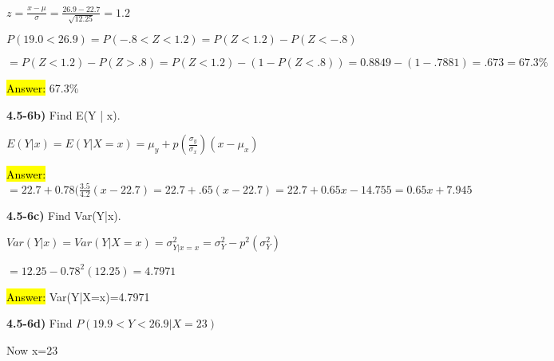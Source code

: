 \documentclass{article}
\begin{document}
\vspace{2mm}


$z=\frac{x-\mu}{\sigma}=\frac{26.9-22.7}{\sqrt{12.25}}=1.2$

\vspace{2mm}



$P(19.0 < 26.9)=P(-.8 < Z < 1.2)=P(Z < 1.2)-P(Z <-.8)$

\vspace{2mm}

$=P(Z < 1.2) - P(Z > .8)=P(Z < 1.2) - (1-P(Z <.8))=0.8849-(1-.7881)=.673=67.3\%$

\vspace{2mm}


\hl{Answer:} 67.3\%


\vspace{4mm}

\textbf{4.5-6b)} Find E(Y | x).

\vspace{2mm}

$E(Y | x)=E(Y | X=x)=\mu_{y}+p(\frac{\sigma_{y}}{\sigma_{x}})(x-\mu_{x})$

\vspace{2mm}

 \hl{Answer:}  $=22.7+0.78(\frac{3.5}{4.2}(x-22.7)=22.7+.65(x-22.7)=22.7+0.65x-14.755=0.65x+7.945$

 

 
 \vspace{4mm}
 

\textbf{4.5-6c)} Find Var(Y|x).

\vspace{2mm}

$Var(Y|x)=Var(Y|X=x)=\sigma_{Y|x=x}^{2}=\sigma_{Y}^{2}-p^{2}(\sigma_{Y}^{2})$

\vspace{2mm}

$=12.25-0.78^{2}(12.25)=4.7971$

\vspace{2mm}


 \hl{Answer:} Var(Y|X=x)=4.7971
 
 
 \vspace{4mm}
\textbf{4.5-6d)} Find $P(19.9 < Y < 26.9 | X=23)$

\vspace{2mm}

Now x=23

\vspace{2mm}
\end{document}
